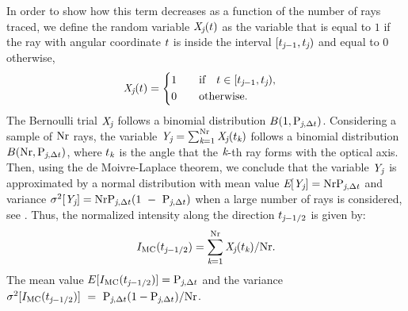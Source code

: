 In order to show how this term decreases as a function of the number of rays traced,
we define the random variable $\textit{X}_{\textit{j}}(t)$ as the variable that is equal to $1$ if the ray with angular coordinate $t$
is inside the interval $[t_{\textit{j}-1}, t_{\textit{j}})$ and equal to $0$ otherwise,
\begin{equation}
\label{radom_variable}
\textit{X}_{\textit{j}}(t) = \begin{cases} \begin{aligned}
1& \qquad \mbox{if} \quad t\in [t_{\textit{j}-1}, t_{\textit{j}}),\\
0 & \qquad \mbox{otherwise}.
\end{aligned}\end{cases}
\end{equation}
The Bernoulli trial $ \textit{X}_{\textit{j}}$ follows a binomial distribution $B(1,\textrm{P}_{\textit{j}, \Delta t})$.
Considering a sample of $\textrm{Nr}$ rays, the variable $\textit{Y}_{\textit{j}} = \sum_{\textit{k}=1}^{\textrm{Nr}} \textit{X}_{\textit{j}}(t_{\textit{k}})$
follows a binomial distribution $B(\textrm{Nr}, \textrm{P}_{\textit{j},\Delta t})$, where $t_{\textit{k}}$ is the angle that the $\textit{k}$-th ray forms
 with the optical axis. Then, using the de Moivre-Laplace theorem, we conclude that the variable $\textit{Y}_{\textit{j}}$ is approximated by a normal distribution with mean value
$\textit{E}[\textit{Y}_{\textit{j}}] = \textrm{Nr}\textrm{P}_{\textit{j}, \Delta t}$ and variance $\sigma^2[\textit{Y}_{\textit{j}}] = \textrm{Nr}\textrm{P}_{\textit{j}, \Delta t}(1~-~\textrm{P}_{\textit{j}, \Delta t})$
when a large number of rays is considered, see \cite{zolotarev1997modern, rubinstein2016simulation}.
Thus, the normalized intensity along the direction $t_{\textit{j}-1/2}$ is given by:
\begin{equation}I_{\textrm{MC}}(t_{\textit{j}-1/2}) = \sum_{\textit{k}=1}^{\textrm{Nr}}\textit{X}_{\textit{j}}(t_{\textit{k}})/\textrm{Nr}.\end{equation}
The mean value $E[I_{\textrm{MC}}(t_{\textit{j}-1/2})]=\textrm{P}_{\textit{j}, \Delta t}$
and the variance $\sigma^2[I_{\textrm{MC}}(t_{\textit{j}-1/2})] ~=~ \textrm{P}_{\textit{j}, \Delta t}(1-\textrm{P}_{\textit{j}, \Delta t})/\textrm{Nr}$.
